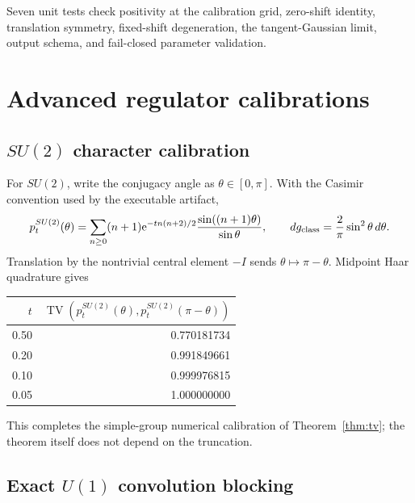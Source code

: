 \documentclass[11pt]{article}
\newcommand{\TV}{\operatorname{TV}}
\newcommand{\e}{\mathrm e}
\theoremstyle{remark}
\begin{document}
Seven unit tests check positivity at the calibration grid, zero-shift identity,
translation symmetry, fixed-shift degeneration, the tangent-Gaussian limit,
output schema, and fail-closed parameter validation.

\section{Advanced regulator calibrations}

\subsection{$SU(2)$ character calibration}

For $SU(2)$, write the conjugacy angle as $\theta\in[0,\pi]$.  With the
Casimir convention used by the executable artifact,
\begin{equation}\label{eq:su2}
 p_t^{SU(2)}(\theta)
 =\sum_{n\ge0}(n+1)\e^{-tn(n+2)/2}
   \frac{\sin((n+1)\theta)}{\sin\theta},
 \qquad
 dg_{\rm class}=\frac2\pi\sin^2\theta\,d\theta.
\end{equation}
Translation by the nontrivial central element $-I$ sends
$\theta\mapsto\pi-\theta$.  Midpoint Haar quadrature gives
\begin{center}
\begin{tabular}{rr}
\toprule
$t$ & $\TV(p_t^{SU(2)}(\theta),p_t^{SU(2)}(\pi-\theta))$\\
\midrule
0.50 & 0.770181734\\
0.20 & 0.991849661\\
0.10 & 0.999976815\\
0.05 & 1.000000000\\
\bottomrule
\end{tabular}
\end{center}
This completes the simple-group numerical calibration of
Theorem~\ref{thm:tv}; the theorem itself does not depend on the truncation.

\subsection{Exact $U(1)$ convolution blocking}
\end{document}
